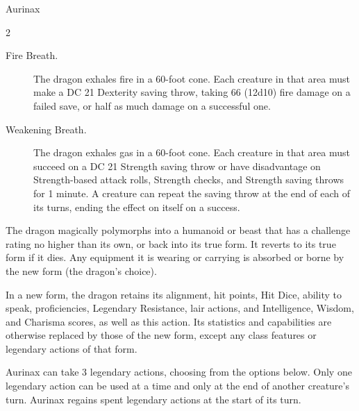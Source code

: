 \documentclass[10pt,a4paper,twoside,bg=print,twocolumn,openany,nodeprecatedcode]{dndbook}
\begin{document}
\begin{DndMonster}[float*=b,width=\textwidth + 8pt]{Aurinax}
\begin{multicols}{2}
\begin{description}
\item[Fire Breath.]
The dragon exhales fire in a 60-foot cone. Each creature in that area must make a DC 21 Dexterity saving throw, taking 66 (12d10) fire damage on a failed save, or half as much damage on a successful one.
\item[Weakening Breath.]
The dragon exhales gas in a 60-foot cone. Each creature in that area must succeed on a DC 21 Strength saving throw or have disadvantage on Strength-based attack rolls, Strength checks, and Strength saving throws for 1 minute. A creature can repeat the saving throw at the end of each of its turns, ending the effect on itself on a success.
\end{description}

The dragon magically polymorphs into a humanoid or beast that has a challenge rating no higher than its own, or back into its true form. It reverts to its true form if it dies. Any equipment it is wearing or carrying is absorbed or borne by the new form (the dragon's choice).

In a new form, the dragon retains its alignment, hit points, Hit Dice, ability to speak, proficiencies, Legendary Resistance, lair actions, and Intelligence, Wisdom, and Charisma scores, as well as this action. Its statistics and capabilities are otherwise replaced by those of the new form, except any class features or legendary actions of that form.

Aurinax can take 3 legendary actions, choosing from the options below. Only one legendary action can be used at a time and only at the end of another creature's turn. Aurinax regains spent legendary actions at the start of its turn.

\begin{DndMonsterLegendaryActions}
\end{DndMonsterLegendaryActions}
\end{multicols}
\end{DndMonster}
\end{document}
